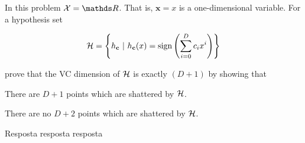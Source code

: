 \begin{enunciado}{16}
    In this problem $\xset = \conjR$. That is, $\mathbf{x} = x$ is a one-dimensional variable. For a hypothesis set
    
    $$ \mathcal{H} = \left\{ h_\mathbf{c}~|~h_\mathbf{c}(x) = \text{sign}\left(\sum\limits_{i=0}^{D} c_i x^i \right) \right\}$$
    
    prove that the VC dimension of $\mathcal{H}$ is exactly $(D + 1)$ by showing that
    
     There are $D + 1$ points which are shattered by $\mathcal{H}$.
    
     There are no $D + 2$ points which are shattered by $\mathcal{H}$.
\end{enunciado}

Resposta resposta resposta